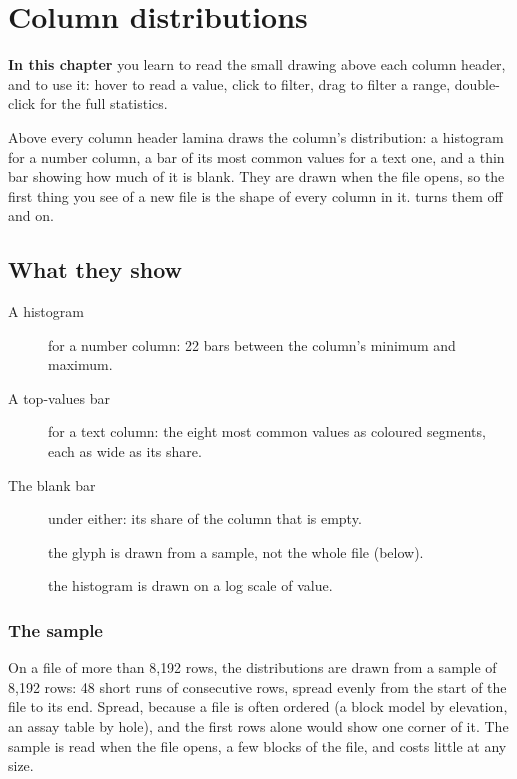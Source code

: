 \chapter{Column distributions}\label{ch:gutter}
\begin{goals}
\textbf{In this chapter} you learn to read the small drawing above each column header, and to use it:
hover to read a value, click to filter, drag to filter a range, double-click for the full statistics.
\end{goals}

Above every column header lamina draws the column's distribution: a histogram for a number column, a bar
of its most common values for a text one, and a thin bar showing how much of it is blank. They are
drawn when the file opens, so the first thing you see of a new file is the shape of every column in it.
 turns them off and on.


\section{What they show}\label{sec:glyphs}

\begin{description}
\item[A histogram] for a number column: 22 bars between the column's minimum and maximum.
\item[A top-values bar] for a text column: the eight most common values as coloured segments, each as
wide as its share.
\item[The blank bar] under either: its share of the column that is empty.
\item[] the glyph is drawn from a sample, not the whole file (below).
\item[] the histogram is drawn on a log scale of value.
\end{description}

\subsection{The sample}\label{sec:gutter-sample}

On a file of more than 8{,}192 rows, the distributions are drawn from a sample of 8{,}192 rows: 48 short
runs of consecutive rows, spread evenly from the start of the file to its end. Spread, because a file is
often ordered (a block model by elevation, an assay table by hole), and the first rows alone would show
one corner of it. The sample is read when the file opens, a few blocks of the file, and costs little at
any size.

